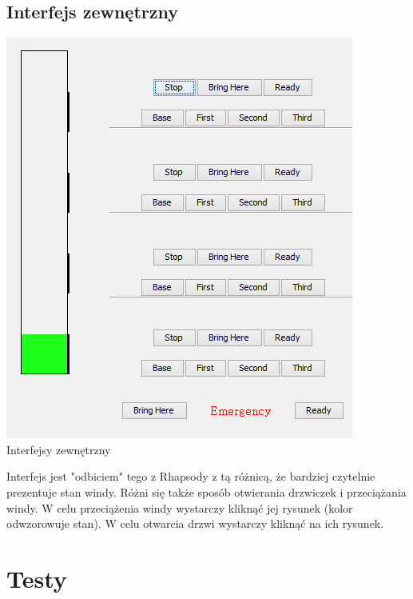 \documentclass[a4paper,11pt]{article}
\begin{document}
\subsection{Interfejs zewnętrzny}
\begin{center} 
\includegraphics{images/oGui.PNG} \\Interfejsy zewnętrzny\\ 
\end{center} 
Interfejs jest "odbiciem" tego z Rhapsody z tą różnicą, że bardziej czytelnie prezentuje stan windy. Różni się także sposób otwierania 
drzwiczek i przeciążania windy. W celu przeciążenia windy wystarczy kliknąć jej rysunek (kolor odwzorowuje stan). W celu otwarcia drzwi 
wystarczy kliknąć na ich rysunek.

\section{Testy}
\end{document}
